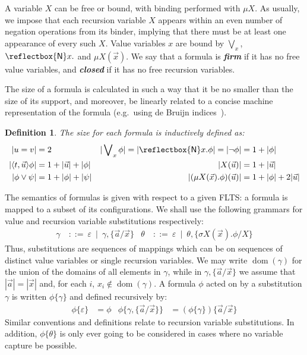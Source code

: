\documentclass[10pt,a4paper]{article}
\newtheorem{definition}[theorem]{Definition}
\theoremstyle{definition}
\theoremstyle{remark}
\newcommand\boldemph[1]{\emph{\textbf{#1}}}
\newcommand\new[0]{\reflectbox{\ensuremath{\mathsf{N}}}}
\newcommand\fresh[1]{\new #1.}
\DeclareMathOperator{\dom}{dom}
\newcommand\diam[1]{\langle#1\rangle}
\begin{document}
A variable $X$ can be free or bound, with binding performed with $\mu X$.
 As usually, we impose that each recursion variable $X$ appears within an even number of negation operations from its binder, implying that there must be at least one appearance of every such $X$.  
Value variables $x$ are bound by $\bigvee_{x}$, $\fresh{x}$ and $\mu X(\vec x)$. 
We say that a formula is \boldemph{firm} if it has no free value variables, and \boldemph{closed} if it has no free recursion variables.

The size of a formula is calculated in such a way that it be no smaller than the size of its support, and moreover, be linearly related to a concise machine representation of the formula (e.g.\ using de Bruijn indices~\cite{DEBRUIJN1972381}).


\begin{definition}\label{def:formSize}
    The size for each formula is inductively defined as:
  \begin{align*}
    |u=v| &= 2 &
    |\bigvee\nolimits_x\phi| = |\fresh{x}\phi| = |\lnot\phi| &= 1+|\phi|\\
    |\diam{t, \vec u}\phi| &= 1 + |\vec u| + |\phi| &
    | X(\vec u)| &= 1+|\vec u|\\
    |\phi\lor\psi| &= 1+|\phi| + |\psi| &
    | (\mu X(\vec x).\phi)(\vec u)|&= 1+|\phi|+2|\vec u|
    \end{align*}
\end{definition}

The semantics of formulas is given with respect to a given FLTS: a formula is mapped to a subset of its configurations. We shall use the following grammars for value and recursion variable substitutions respectively:
\begin{align*}
\gamma\ &::=\ \varepsilon\ \mid\ \gamma,\{\vec a/\vec x\} &
\theta\ &::=\ \varepsilon\  \mid\ \theta,\{\sigma X(\vec x).\phi/X\}
\end{align*}
Thus, substitutions are sequences of mappings which can be on sequences of distinct value variables or single recursion variables.
We may write $\dom(\gamma)$ for the union of the domains of all elements in $\gamma$, while in $\gamma,\{\vec a/\vec x\}$ we assume that $|\vec a|=|\vec x|$ and, for each $i$, $x_i\notin\dom(\gamma)$. A formula $\phi$ acted on by a substitution $\gamma$ is written $\phi\{\gamma\}$ and defined recursively by:
\begin{align*}
  \phi\{\varepsilon\} &= \phi &
  \phi\{\gamma,\{\vec a/\vec x\}\} &=  (\phi\{\gamma\})\{\vec a/\vec x\}
\end{align*}
Similar conventions and definitions relate to recursion variable substitutions.
In addition, $\phi\{\theta\}$ is only ever going to be considered in cases where no variable capture be possible.
\end{document}
